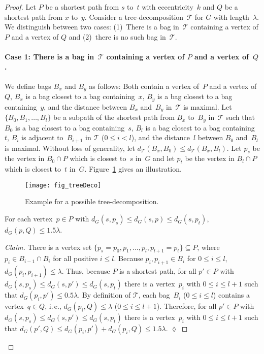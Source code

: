 \documentclass[10pt]{llncs}
\makeatletter
\newcommand{\calT}{\mathcal{T}}
\newcommand{\ie}{i.\,e.\@ifnextchar{,}{}{~}}
\DeclareRobustCommand{\qedClaim}
{\ifmmode \lozenge \else \leavevmode\unskip\penalty9999 \hbox{}\nobreak\hfill \quad\hbox{$\lozenge$}\fi }
\makeatother
\begin{document}
\begin{proof}
Let $P$ be a shortest path from $s$ to~$t$ with eccentricity~$k$ and $Q$ be a shortest path from $x$ to~$y$.
Consider a tree-decomposition~$\calT$ for $G$ with length~$\lambda$.
We distinguish between two cases:
(1)~There is a bag in~$\calT$ containing a vertex of $P$ and a vertex of $Q$ and (2)~there is no such bag in~$\calT$.

\paragraph{Case 1: There is a bag in~$\calT$ containing a vertex of $P$ and a vertex of~$Q$.}
We define bags $B_x$ and $B_y$ as follows:
Both contain a vertex of~$P$ and a vertex of~$Q$, $B_x$ is a bag closest to a bag containing~$x$, $B_y$ is a bag closest to a bag containing~$y$, and the distance between $B_x$ and~$B_y$ in~$\calT$ is maximal.
Let $\{ B_0, B_1, \ldots, B_l \}$ be a subpath of the shortest path from $B_x$ to~$B_y$ in~$\calT$ such that $B_0$ is a bag closest to a bag containing~$s$, $B_l$ is a bag closest to a bag containing~$t$, $B_i$ is adjacent to~$B_{i+1}$ in $\calT$ ($0 \leq i < l$), and the distance~$l$ between $B_0$ and~$B_l$ is maximal.
Without loss of generality, let $d_{\calT}(B_x, B_0) \leq d_{\calT}(B_x, B_l)$.
Let $p_s$ be the vertex in $B_0 \cap P$ which is closest to~$s$ in~$G$ and let $p_t$ be the vertex in $B_l \cap P$ which is closest to~$t$ in~$G$.
Figure~\ref{fig:TreeDecoEg} gives an illustration.

\begin{figure}
    [htb]
    \centering
    \texttt{[image: fig\_treeDeco]}\caption
    {
        Example for a possible tree-decomposition.
    }
    \label{fig:TreeDecoEg}
\end{figure}

\begin{claim}
For each vertex~$p \in P$ with $d_G(s, p_s) \leq d_G(s, p) \leq d_G(s, p_t)$, $d_G(p, Q) \leq 1.5 \lambda$.
\end{claim}

\begin{proof}
    [Claim]
There is a vertex set $\{ p_s = p_0, p_1, \ldots, p_l, p_{l+1} = p_t \} \subseteq P$, where $p_i \in B_{i-1} \cap B_i$ for all positive $i \leq l$.
Because $p_i, p_{i+1} \in B_i$ for $0 \leq i \leq l$, $d_G(p_i, p_{i+1}) \leq \lambda$.
Thus, because $P$ is a shortest path, for all $p' \in P$ with $d_G(s, p_s) \leq d_G(s, p') \leq d_G(s, p_t)$ there is a vertex~$p_i$ with $0 \leq i \leq l+1$ such that $d_G(p_i, p') \leq 0.5 \lambda$.
By definition of $\calT$, each bag~$B_i$ ($0 \leq i \leq l$) contains a vertex~$q \in Q$, \ie, $d_G(p_i, Q) \leq \lambda$ ($0 \leq i \leq l+1$).
Therefore, for all $p' \in P$ with $d_G(s, p_s) \leq d_G(s, p') \leq d_G(s, p_t)$ there is a vertex~$p_i$ with $0 \leq i \leq l+1$ such that $d_G(p', Q) \leq d_G(p_i, p') + d_G(p_i, Q) \leq 1.5 \lambda$.
\qedClaim
\end{proof}


\end{proof}
\end{document}
